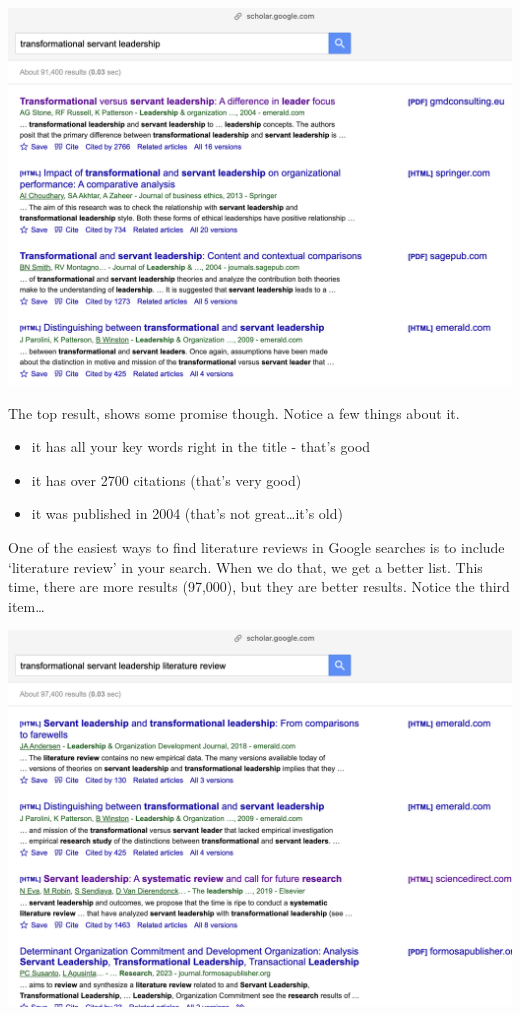 \documentclass[
]{book}
\providecommand{\tightlist}{%
  \setlength{\itemsep}{0pt}\setlength{\parskip}{0pt}}
\theoremstyle{definition}
\theoremstyle{definition}
\theoremstyle{definition}
\theoremstyle{definition}
\theoremstyle{remark}
\begin{document}
\includegraphics{assets/u2/google-search1.png}

The top result, shows some promise though. Notice a few things about it.

\begin{itemize}
\tightlist
\item
  it has all your key words right in the title - that's good
\item
  it has over 2700 citations (that's very good)
\item
  it was published in 2004 (that's not great\ldots it's old)
\end{itemize}

One of the easiest ways to find literature reviews in Google searches is to include `literature review' in your search. When we do that, we get a better list. This time, there are more results (97,000), but they are better results. Notice the third item\ldots{}

\includegraphics{assets/u2/google-search2.png}
\end{document}
